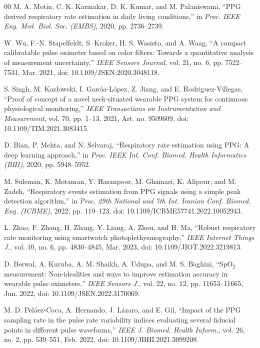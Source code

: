 \documentclass{ieeeaccess}
\begin{document}
\begin{thebibliography}{00}
 M. A. Motin, C. K. Karmakar, D. K. Kumar, and M. Palaniswami, ``PPG derived respiratory rate estimation in daily living conditions,'' in \emph{Proc. IEEE Eng. Med. Biol. Soc. (EMBS)}, 2020, pp. 2736--2739.

 W. Wu, F.-N. Stapelfeldt, S. Kroker, H. S. Wasisto, and A. Waag, ``A compact calibratable pulse oximeter based on color filters: Towards a quantitative analysis of measurement uncertainty,'' \emph{IEEE Sensors Journal}, vol. 21, no. 6, pp. 7522--7531, Mar. 2021, doi: 10.1109/JSEN.2020.3048118.

 S. Singh, M. Koz{\l}owski, I. Garc{\'\i}a-L{\'o}pez, Z. Jiang, and E. Rodriguez-Villegas, ``Proof of concept of a novel neck-situated wearable PPG system for continuous physiological monitoring,'' \emph{IEEE Transactions on Instrumentation and Measurement}, vol. 70, pp. 1--13, 2021, Art. no. 9509609, doi: 10.1109/TIM.2021.3083415.

 D. Bian, P. Mehta, and N. Selvaraj, ``Respiratory rate estimation using PPG: A deep learning approach,'' in \emph{Proc. IEEE Int. Conf. Biomed. Health Informatics (BHI)}, 2020, pp. 5948--5952.

 M. Suleman, K. Motaman, Y. Hasanpoor, M. Ghamari, K. Alipour, and M. Zadeh, ``Respiratory events estimation from PPG signals using a simple peak detection algorithm,'' in \emph{Proc. 29th National and 7th Int. Iranian Conf. Biomed. Eng. (ICBME)}, 2022, pp. 119--123, doi: 10.1109/ICBME57741.2022.10052943.

 L. Zhao, F. Zhang, H. Zhang, Y. Liang, A. Zhou, and H. Ma, ``Robust respiratory rate monitoring using smartwatch photoplethysmography,'' \emph{IEEE Internet Things J.}, vol. 10, no. 6, pp. 4830--4845, Mar. 2023, doi: 10.1109/JIOT.2022.3219813.

 D. Berwal, A. Kuruba, A. M. Shaikh, A. Udupa, and M. S. Baghini, ``SpO$_2$ measurement: Non-idealities and ways to improve estimation accuracy in wearable pulse oximeters,'' \emph{IEEE Sensors J.}, vol. 22, no. 12, pp. 11653--11665, Jun. 2022, doi: 10.1109/JSEN.2022.3170069.

 M. D. Pel\'{a}ez-Coca, A. Hernando, J. L\'{a}zaro, and E. Gil, ``Impact of the PPG sampling rate in the pulse rate variability indices evaluating several fiducial points in different pulse waveforms,'' \emph{IEEE J. Biomed. Health Inform.}, vol. 26, no. 2, pp. 539--551, Feb. 2022, doi: 10.1109/JBHI.2021.3099208.


\end{thebibliography}
\end{document}
